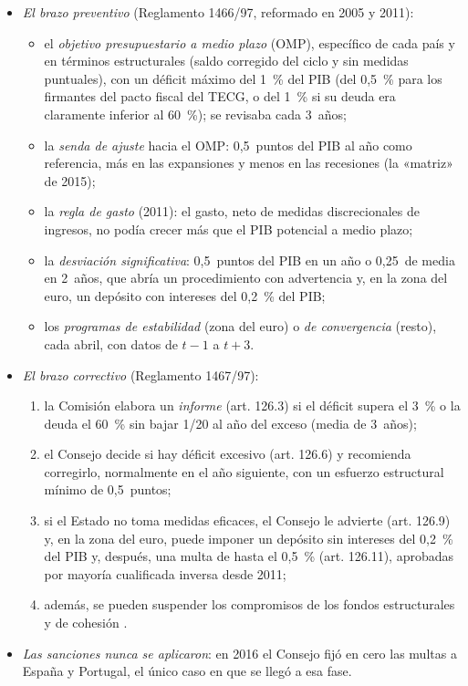 \documentclass[11pt]{article}
\begin{document}
\begin{itemize}
\item \emph{El brazo preventivo} (Reglamento 1466/97, reformado en 2005 y 2011):
  \begin{itemize}
  \item el \emph{objetivo presupuestario a medio plazo} (OMP), específico de cada país y en términos estructurales (saldo corregido del ciclo y sin medidas puntuales), con un déficit máximo del 1~\% del PIB (del 0,5~\% para los firmantes del pacto fiscal del TECG, o del 1~\% si su deuda era claramente inferior al 60~\%); se revisaba cada 3~años;
  \item la \emph{senda de ajuste} hacia el OMP: 0,5~puntos del PIB al año como referencia, más en las expansiones y menos en las recesiones (la «matriz» de 2015);
  \item la \emph{regla de gasto} (2011): el gasto, neto de medidas discrecionales de ingresos, no podía crecer más que el PIB potencial a medio plazo;
  \item la \emph{desviación significativa}: 0,5~puntos del PIB en un año o 0,25~de media en 2~años, que abría un procedimiento con advertencia y, en la zona del euro, un depósito con intereses del 0,2~\% del PIB;
  \item los \emph{programas de estabilidad} (zona del euro) o \emph{de convergencia} (resto), cada abril, con datos de $t-1$ a $t+3$.
  \end{itemize}
\item \emph{El brazo correctivo} (Reglamento 1467/97):
  \begin{enumerate}
  \item la Comisión elabora un \emph{informe} (art. 126.3) si el déficit supera el 3~\% o la deuda el 60~\% sin bajar 1/20 al año del exceso (media de 3~años);
  \item el Consejo decide si hay déficit excesivo (art. 126.6) y recomienda corregirlo, normalmente en el año siguiente, con un esfuerzo estructural mínimo de 0,5~puntos;
  \item si el Estado no toma medidas eficaces, el Consejo le advierte (art. 126.9) y, en la zona del euro, puede imponer un depósito sin intereses del 0,2~\% del PIB y, después, una multa de hasta el 0,5~\% (art. 126.11), aprobadas por mayoría cualificada inversa desde 2011;
  \item además, se pueden suspender los compromisos de los fondos estructurales y de cohesión .
  \end{enumerate}
\item \emph{Las sanciones nunca se aplicaron}: en 2016 el Consejo fijó en cero las multas a España y Portugal, el único caso en que se llegó a esa fase.
\end{itemize}
\end{document}
